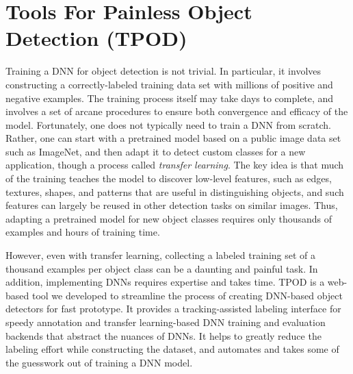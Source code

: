 \section{Tools For Painless Object Detection (TPOD)}
\label{sec: app-dev-tpod}

Training a DNN for object detection is not trivial.  In particular, it involves
constructing a correctly-labeled training data set with millions of positive and
negative examples. The training process itself may take days to complete, and
involves a set of arcane procedures to ensure both convergence and efficacy of
the model. Fortunately, one does not typically need to train a DNN from scratch.
Rather, one can start with a pretrained model based on a public image data set
such as ImageNet, and then adapt it to detect custom classes for a new
application, though a process called \emph{transfer learning}.  The key idea is
that much of the training teaches the model to discover low-level features, such
as edges, textures, shapes, and patterns that are useful in distinguishing
objects, and such features can largely be reused in other detection tasks on
similar images.  Thus, adapting a pretrained model for new object classes
requires only thousands of examples and hours of training time. 

However, even with transfer learning, collecting a labeled training set of a
thousand examples per object class can be a daunting and painful task. In
addition, implementing DNNs requires expertise and takes time. TPOD is a
web-based tool we developed to streamline the process of creating DNN-based
object detectors for fast prototype. It provides a tracking-assisted labeling
interface for speedy annotation and transfer learning-based DNN training and
evaluation backends that abstract the nuances of DNNs. It helps to greatly
reduce the labeling effort while constructing the dataset, and automates and
takes some of the guesswork out of training a DNN model.


